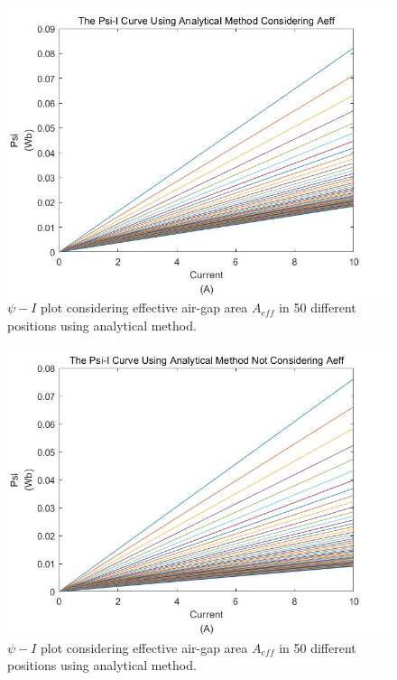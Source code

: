 \documentclass[a4paper]{IEEEtran}
\begin{document}
{\begin{figure}[!ht]
\begin{centering}
\includegraphics[scale=0.3]{The Psi-I Curve Using Analytical Method Considering Aeff.jpg}
\par\end{centering}   
\caption{$\psi-I$ plot considering effective air-gap area $A_{eff}$ in 50 different positions using analytical method.\label{psi-i_analytical_with_aeff}}
\end{figure} 


\begin{figure}[!ht]
\begin{centering}
\includegraphics[scale=0.3]{The Psi-I Curve Using Analytical Method Not Considering Aeff.jpg}
\par\end{centering}   
\caption{$\psi-I$ plot considering effective air-gap area $A_{eff}$ in 50 different positions using analytical method.\label{psi-i_analytical_without_aeff}}
\end{figure} 

}
\end{document}
